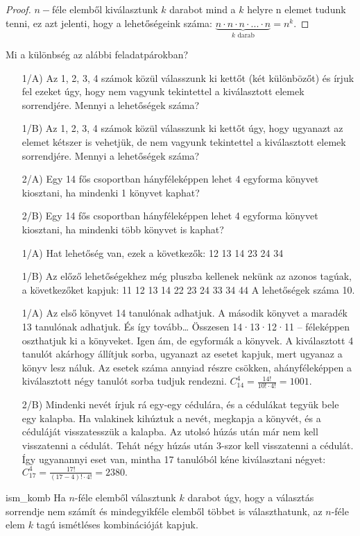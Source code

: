 \begin{proof}
$n-$féle elemből kiválasztunk $k$ darabot mind a $k$ helyre n elemet
tudunk tenni, ez azt jelenti, hogy a lehetőségeink száma: $\underbrace{n\cdot n\cdot n\cdot...\cdot n}_{k\,\,\text{darab}}=n^{k}.$ 
\end{proof}
\begin{problem}
	Mi a különbség az alábbi feladatpárokban?
\begin{itemize}
\item[1/A)] Az 1, 2, 3, 4 számok közül válasszunk ki kettőt (két különbözőt)
és írjuk fel ezeket úgy, hogy nem vagyunk tekintettel a kiválasztott
elemek sorrendjére. Mennyi a lehetőségek száma?
\item[1/B)] Az 1, 2, 3, 4 számok közül válasszunk ki kettőt úgy, hogy ugyanazt
az elemet kétszer is vehetjük, de nem vagyunk tekintettel a kiválasztott
elemek sorrendjére. Mennyi a lehetőségek száma?
\item[2/A)] Egy 14 fős csoportban hányféleképpen lehet 4 egyforma könyvet
kiosztani, ha mindenki 1 könyvet kaphat? 
\item[2/B)] Egy 14 fős csoportban hányféleképpen lehet 4 egyforma könyvet
kiosztani, ha mindenki több könyvet is kaphat?
\end{itemize}
\end{problem}
\begin{solution}
\begin{itemize}
\item[1/A)] Hat lehetőség van, ezek a következők: 12 13 14 23 24 34
\item[1/B)] Az előző lehetőségekhez még pluszba kellenek nekünk az azonos
tagúak, a következőket kapjuk: 11 12 13 14 22 23 24 33 34 44 A lehetőségek
száma 10.
\item[1/A)] Az első könyvet 14 tanulónak adhatjuk. A második könyvet a maradék
13 tanulónak adhatjuk. És így tovább… Összesen 14·13·12·11 -- féleképpen
oszthatjuk ki a könyveket. Igen ám, de egyformák a könyvek. A kiválasztott
4 tanulót akárhogy állítjuk sorba, ugyanazt az esetet kapjuk, mert
ugyanaz a könyv lesz náluk. Az esetek száma annyiad részre csökken,
ahányféleképpen a kiválasztott négy tanulót sorba tudjuk rendezni.
$C_{14}^{4}=\frac{14!}{10!\cdot4!}=1001.$
\item[2/B)] Mindenki nevét írjuk rá egy-egy cédulára, és a cédulákat tegyük
bele egy kalapba. Ha valakinek kihúztuk a nevét, megkapja a könyvét,
és a céduláját visszatesszük a kalapba. Az utolsó húzás után már nem
kell visszatenni a cédulát. Tehát négy húzás után 3-szor kell visszatenni
a cédulát. Így ugyanannyi eset van, mintha 17 tanulóból kéne kiválasztani
négyet: $C_{17}^{4}=\frac{17!}{(17-4)!\cdot4!}=2380.$ 
\end{itemize}

\end{solution}
\begin{definition}{ism_komb}
Ha $n$-féle elemből választunk $k$ darabot úgy, hogy a választás
sorrendje nem számít és mindegyikféle elemből többet is választhatunk,
az $n$-féle elem $k$ tagú ismétléses kombinációját kapjuk.
\end{definition}

